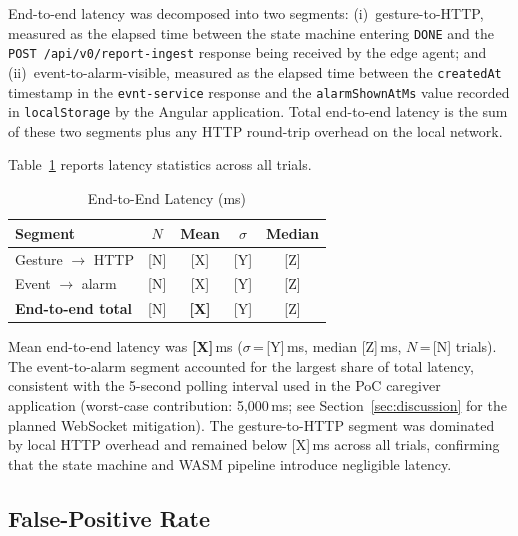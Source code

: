 End-to-end latency was decomposed into two segments: (i)~gesture-to-HTTP, measured
as the elapsed time between the state machine entering \texttt{DONE} and the
\texttt{POST /api/v0/report-ingest} response being received by the edge agent; and
(ii)~event-to-alarm-visible, measured as the elapsed time between the
\texttt{createdAt} timestamp in the \texttt{evnt-service} response and the
\texttt{alarmShownAtMs} value recorded in \texttt{localStorage} by the Angular
application. Total end-to-end latency is the sum of these two segments plus any
HTTP round-trip overhead on the local network.

Table~\ref{tab:latency} reports latency statistics across all trials.

% 
\begin{table}[!t]
  \renewcommand{\arraystretch}{1.15}
  \caption{End-to-End Latency (ms)}
  \label{tab:latency}
  \centering
  \begin{tabular}{lcccc}
    \toprule
    Segment & $N$ & Mean & $\sigma$ & Median \\
    \midrule
    Gesture $\rightarrow$ HTTP  & [N] & [X] & [Y] & [Z] \\
    Event $\rightarrow$ alarm   & [N] & [X] & [Y] & [Z] \\
    \textbf{End-to-end total}   & [N] & \textbf{[X]} & [Y] & [Z] \\
    \bottomrule
  \end{tabular}
\end{table}

Mean end-to-end latency was \textbf{[X]}\,ms ($\sigma$\,=\,[Y]\,ms, median
[Z]\,ms, $N$\,=\,[N] trials). The event-to-alarm segment accounted for the
largest share of total latency, consistent with the 5-second polling interval
used in the PoC caregiver application (worst-case contribution: 5{,}000\,ms; see
Section~\ref{sec:discussion} for the planned WebSocket mitigation). The
gesture-to-HTTP segment was dominated by local HTTP overhead and remained below
[X]\,ms across all trials, confirming that the state machine and WASM pipeline
introduce negligible latency.

\subsection{False-Positive Rate}
\label{sec:fpr}

